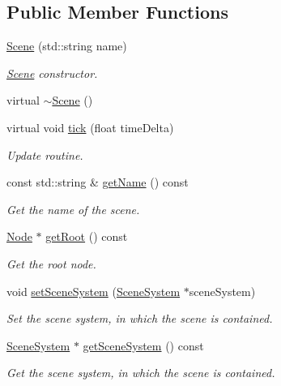 \subsection*{Public Member Functions}
\begin{DoxyCompactItemize}
\item 
\mbox{\hyperlink{classec_1_1_scene_a9abac0a0de42ff4e9eb6481cf1927754}{Scene}} (std\+::string name)
\begin{DoxyCompactList}\small\item\em \mbox{\hyperlink{classec_1_1_scene}{Scene}} constructor. \end{DoxyCompactList}\item 
virtual \mbox{\hyperlink{classec_1_1_scene_a25e849d1bd5a9a71af922c3668115cb6}{$\sim$\+Scene}} ()
\item 
virtual void \mbox{\hyperlink{classec_1_1_scene_a09deb945a2c8255d70a68b0aaddaecb6}{tick}} (float time\+Delta)
\begin{DoxyCompactList}\small\item\em Update routine. \end{DoxyCompactList}\item 
const std\+::string \& \mbox{\hyperlink{classec_1_1_scene_a24c00d38f3b17123f10f02ff77830f62}{get\+Name}} () const
\begin{DoxyCompactList}\small\item\em Get the name of the scene. \end{DoxyCompactList}\item 
\mbox{\hyperlink{classec_1_1_node}{Node}} $\ast$ \mbox{\hyperlink{classec_1_1_scene_aef77276f4a386c5b66159ecb1d4d072c}{get\+Root}} () const
\begin{DoxyCompactList}\small\item\em Get the root node. \end{DoxyCompactList}\item 
void \mbox{\hyperlink{classec_1_1_scene_a87a6277fea206956c0a7175cf308ece0}{set\+Scene\+System}} (\mbox{\hyperlink{classec_1_1_scene_system}{Scene\+System}} $\ast$scene\+System)
\begin{DoxyCompactList}\small\item\em Set the scene system, in which the scene is contained. \end{DoxyCompactList}\item 
\mbox{\hyperlink{classec_1_1_scene_system}{Scene\+System}} $\ast$ \mbox{\hyperlink{classec_1_1_scene_a95b79ca1dc856cb50262ab4b9e72465f}{get\+Scene\+System}} () const
\begin{DoxyCompactList}\small\item\em Get the scene system, in which the scene is contained. \end{DoxyCompactList}\item 

\end{DoxyCompactItemize}
